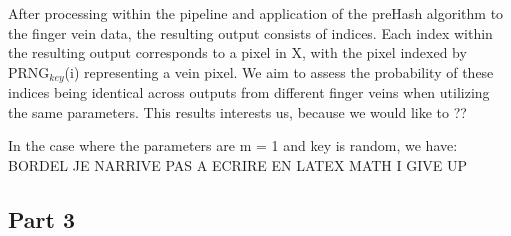 After processing within the pipeline and application of the preHash algorithm to the finger vein data, the resulting output consists of indices. Each index within the resulting output corresponds to a pixel in X, with the pixel indexed by PRNG$_{key}$(i) representing a vein pixel. We aim to assess the probability of these indices being identical across outputs from different finger veins when utilizing the same parameters. This results interests us, because we would like to ??


In the case where the parameters are m = 1 and key is random, we have: 
BORDEL JE NARRIVE PAS A ECRIRE EN LATEX MATH I GIVE UP





\subsection{Part 3}